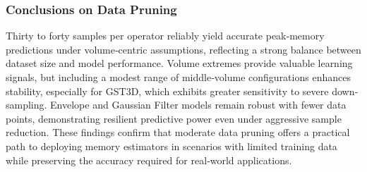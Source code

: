 \subsubsection{Conclusions on Data Pruning}
\label{subsec:data-reduction-conclusions}

Thirty to forty samples per operator reliably yield accurate peak‐memory predictions under volume‐centric assumptions, reflecting a strong balance between dataset size and model performance.
Volume extremes provide valuable learning signals, but including a modest range of middle‐volume configurations enhances stability, especially for \ac{GST3D}, which exhibits greater sensitivity to severe down‐sampling.
Envelope and Gaussian Filter models remain robust with fewer data points, demonstrating resilient predictive power even under aggressive sample reduction.
These findings confirm that moderate data pruning offers a practical path to deploying memory estimators in scenarios with limited training data while preserving the accuracy required for real‐world applications.